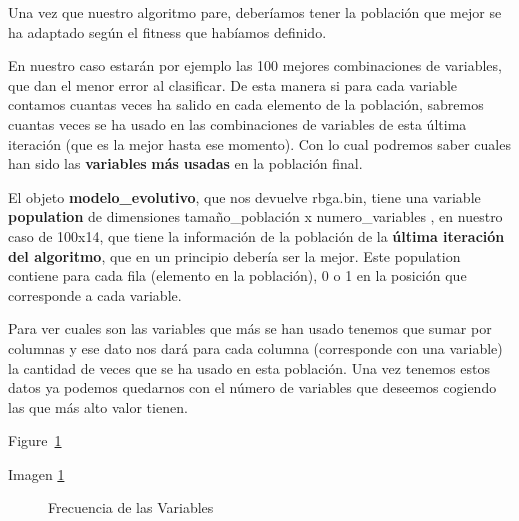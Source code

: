 \documentclass[
  a4paper,
  DIV=11,
  numbers=noendperiod]{scrreprt}
\begin{document}
Una vez que nuestro algoritmo pare, deberíamos tener la población que
mejor se ha adaptado según el fitness que habíamos definido.

En nuestro caso estarán por ejemplo las 100 mejores combinaciones de
variables, que dan el menor error al clasificar. De esta manera si para
cada variable contamos cuantas veces ha salido en cada elemento de la
población, sabremos cuantas veces se ha usado en las combinaciones de
variables de esta última iteración (que es la mejor hasta ese momento).
Con lo cual podremos saber cuales han sido las \textbf{variables}
\textbf{más} \textbf{usadas} en la población final.

El objeto \textbf{modelo\_evolutivo}, que nos devuelve rbga.bin, tiene
una variable \textbf{population} de dimensiones tamaño\_población x
numero\_variables , en nuestro caso de 100x14, que tiene la información
de la población de la \textbf{última iteración del algoritmo}, que en un
principio debería ser la mejor. Este population contiene para cada fila
(elemento en la población), 0 o 1 en la posición que corresponde a cada
variable.

Para ver cuales son las variables que más se han usado tenemos que sumar
por columnas y ese dato nos dará para cada columna (corresponde con una
variable) la cantidad de veces que se ha usado en esta población. Una
vez tenemos estos datos ya podemos quedarnos con el número de variables
que deseemos cogiendo las que más alto valor tienen.

Figure~\ref{fig-frecuencia_variables}

Imagen \ref{fig-frecuencia_variables}

\begin{figure}


\caption{\label{fig-frecuencia_variables}Frecuencia de las Variables}

\end{figure}%
\end{document}
